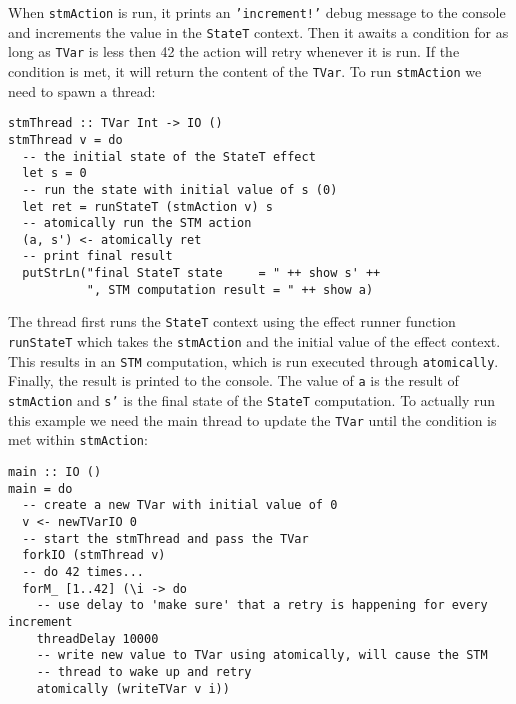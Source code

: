 \medskip %

When \texttt{stmAction} is run, it prints an \texttt{'increment!'} debug message to the console and increments the value in the \texttt{StateT} context. Then it awaits a condition for as long as \texttt{TVar} is less then 42 the action will retry whenever it is run. If the condition is met, it will return the content of the \texttt{TVar}. To run \texttt{stmAction} we need to spawn a thread: \\ %

\begin{footnotesize}
\begin{verbatim}
stmThread :: TVar Int -> IO ()
stmThread v = do
  -- the initial state of the StateT effect
  let s = 0
  -- run the state with initial value of s (0)
  let ret = runStateT (stmAction v) s
  -- atomically run the STM action
  (a, s') <- atomically ret
  -- print final result
  putStrLn("final StateT state     = " ++ show s' ++
           ", STM computation result = " ++ show a)
\end{verbatim}
\end{footnotesize}

\medskip %

The thread first runs the \texttt{StateT} context using the effect runner function \texttt{runStateT} which takes the \texttt{stmAction} and the initial value of the effect context. This results in an \texttt{STM} computation, which is run executed through \texttt{atomically}. Finally, the result is printed to the console. The value of \texttt{a} is the result of \texttt{stmAction} and \texttt{s'} is the final state of the \texttt{StateT} computation. To actually run this example we need the main thread to update the \texttt{TVar} until the condition is met within \texttt{stmAction}: \\ %

\begin{footnotesize}
\begin{verbatim}
main :: IO ()
main = do
  -- create a new TVar with initial value of 0
  v <- newTVarIO 0 
  -- start the stmThread and pass the TVar
  forkIO (stmThread v)
  -- do 42 times...
  forM_ [1..42] (\i -> do
    -- use delay to 'make sure' that a retry is happening for every increment
    threadDelay 10000
    -- write new value to TVar using atomically, will cause the STM
    -- thread to wake up and retry
    atomically (writeTVar v i))
\end{verbatim}
\end{footnotesize}

